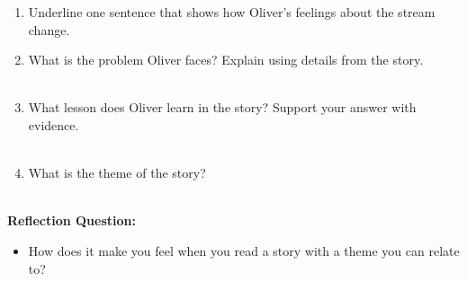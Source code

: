 \documentclass[12pt]{article}
\begin{document}
\vspace{1em}
\begin{tcolorbox}[colframe=black!60, colback=white, 
coltitle=black, colbacktitle=black!15, fonttitle=\bfseries\Large, 
title=Independent Practice, halign title=center, left=10pt, right=10pt, top=10pt, bottom=15pt]




\begin{enumerate}[itemsep=3em]
    \item Underline one sentence that shows how Oliver’s feelings about the stream change.
    \item What is the problem Oliver faces? Explain using details from the story.
 \\[0.8cm] \underline{\hspace{15cm}}  
    \\[0.8cm] \underline{\hspace{15cm}}  


    \item What lesson does Oliver learn in the story? Support your answer with evidence.
\\[0.8cm] \underline{\hspace{15cm}}  
    \\[0.8cm] \underline{\hspace{15cm}}  
    

    \item What is the theme of the story?
\\[0.8cm] \underline{\hspace{15cm}}  
    \\[0.8cm] \underline{\hspace{15cm}}  
   
\end{enumerate}
\end{tcolorbox}

\begin{tcolorbox}[colframe=black!60, colback=white, 
coltitle=black, colbacktitle=black!15, fonttitle=\bfseries\Large, 
title=Exit Ticket, halign title=center, left=10pt, right=10pt, top=10pt, bottom=15pt]
\textbf{Reflection Question:}
\begin{itemize}
    \item How does it make you feel when you read a story with a theme you can relate to?
\\[0.8cm] \underline{\hspace{15cm}}  
    \\[0.8cm] \underline{\hspace{15cm}}  
  
\end{itemize}
\end{tcolorbox}
\end{document}
